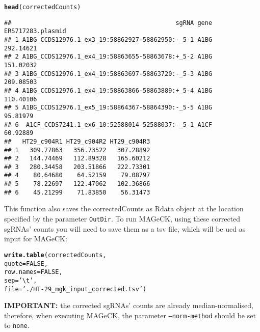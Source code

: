 \documentclass{article}\usepackage[]{graphicx}\usepackage[]{color}
\makeatletter
\newcommand{\hlnum}[1]{\textcolor[rgb]{0.686,0.059,0.569}{#1}}%
\newcommand{\hlstr}[1]{\textcolor[rgb]{0.192,0.494,0.8}{#1}}%
\newcommand{\hlstd}[1]{\textcolor[rgb]{0.345,0.345,0.345}{#1}}%
\newcommand{\hlkwc}[1]{\textcolor[rgb]{0.333,0.667,0.333}{#1}}%
\newcommand{\hlkwd}[1]{\textcolor[rgb]{0.737,0.353,0.396}{\textbf{#1}}}%
\newenvironment{kframe}{%
 \def\at@end@of@kframe{}%
 \ifinner\ifhmode%
  \def\at@end@of@kframe{\end{minipage}}%
  \begin{minipage}{\columnwidth}%
 \fi\fi%
 \def\FrameCommand##1{\hskip\@totalleftmargin \hskip-\fboxsep
 \colorbox{shadecolor}{##1}\hskip-\fboxsep
     \hskip-\linewidth \hskip-\@totalleftmargin \hskip\columnwidth}%
 \MakeFramed {\advance\hsize-\width
   \@totalleftmargin\z@ \linewidth\hsize
   \@setminipage}}%
 {\par\unskip\endMakeFramed%
 \at@end@of@kframe}
\newenvironment{knitrout}{}{} %
\makeatother
\begin{document}
\begin{knitrout}
\color{fgcolor}\begin{kframe}
\begin{alltt}
\hlkwd{head}\hlstd{(correctedCounts)}
\end{alltt}
\begin{verbatim}
##                                             sgRNA gene ERS717283.plasmid
## 1 A1BG_CCDS12976.1_ex3_19:58862927-58862950:-_5-1 A1BG         292.14621
## 2 A1BG_CCDS12976.1_ex4_19:58863655-58863678:+_5-2 A1BG         151.02032
## 3 A1BG_CCDS12976.1_ex4_19:58863697-58863720:-_5-3 A1BG         209.08503
## 4 A1BG_CCDS12976.1_ex4_19:58863866-58863889:+_5-4 A1BG         110.40106
## 5 A1BG_CCDS12976.1_ex5_19:58864367-58864390:-_5-5 A1BG          95.81979
## 6  A1CF_CCDS7241.1_ex6_10:52588014-52588037:-_5-1 A1CF          60.92889
##   HT29_c904R1 HT29_c904R2 HT29_c904R3
## 1   309.77863   356.73522   307.28892
## 2   144.74469   112.89328   165.60212
## 3   280.34458   203.51866   222.73301
## 4    80.64680    64.52159    79.08797
## 5    78.22697   122.47062   102.36866
## 6    45.21299    71.83850    56.31473
\end{verbatim}
\end{kframe}
\end{knitrout}
 
This function also saves the correctedCounts as Rdata object at the location specified by the parameter \texttt{OutDir}.
To run MAGeCK, using these corrected sgRNAs' counts you will need to save them as a tsv file, which will be ued as input for MAGeCK:

\begin{knitrout}
\color{fgcolor}\begin{kframe}
\begin{alltt}
\hlkwd{write.table}\hlstd{(correctedCounts,}
             \hlkwc{quote}\hlstd{=}\hlnum{FALSE}\hlstd{,}
             \hlkwc{row.names} \hlstd{=} \hlnum{FALSE}\hlstd{,}
             \hlkwc{sep}\hlstd{=}\hlstr{'\textbackslash{}t'}\hlstd{,}
             \hlkwc{file}\hlstd{=}\hlstr{'./HT-29_mgk_input_corrected.tsv'}\hlstd{)}
\end{alltt}
\end{kframe}
\end{knitrout}

 
\textbf{IMPORTANT:} the corrected sgRNAs' counts are already median-normalised,
therefore, when executing MAGeCK, the parameter \texttt{--norm-method} should be set to \texttt{none}.
 
\end{document}
